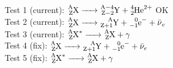 \documentclass{ctexart}
\begin{document}
Test 1 (current): $\ce{^{A}_{Z}X -> ^{A-4}_{Z-2}Y + ^{4}_{2}He^{2+}}$ OK\\
Test 2 (current): $\ce{^{A}_{Z}X -> ^{A}_{Z+1}Y + ^{0}_{-1}e^{-} + \bar{\nu}_e}$\\
Test 3 (current): $\ce{^{A}_{Z}X^{*} -> ^{A}_{Z}X + \gamma}$\\
Test 4 (fix): $\ce{^{A}_{Z}X -> ^{A}_{Z+1}Y + ^{0}_{-1}e^{-}} + \bar{\nu}_e$\\
Test 5 (fix): $\ce{^{A}_{Z}X^{*} -> ^{A}_{Z}X} + \gamma$
\end{document}
